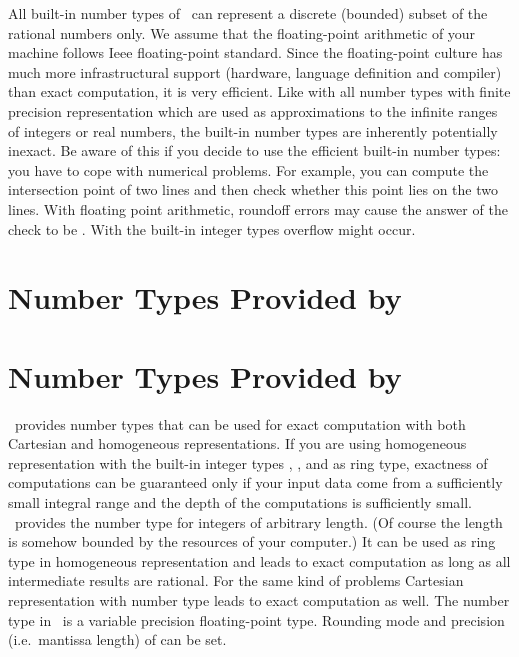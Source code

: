 All built-in number types of \CC\ can represent a discrete (bounded)
subset of the rational numbers only.  We assume that the
floating-point arithmetic of your machine follows {\sc Ieee}
floating-point standard.  Since the floating-point culture has much
more infrastructural support (hardware, language definition and
compiler) than exact computation, it is very efficient.
Like with all number types with finite precision representation
which are used as approximations to the infinite ranges of 
integers or real numbers, the built-in number types are inherently
potentially inexact.
Be aware of this if you decide to use the efficient built-in 
number types: you have to cope with numerical problems.  
For example, you can compute the intersection point of two lines and 
then check whether this point lies on the two lines. 
With floating point arithmetic,
roundoff errors may cause the answer of the check to be . 
With the built-in integer types overflow might occur.

\section{Number Types Provided by \cgal}













\section{Number Types Provided by \leda}
\label{leda-nt}

\leda\ provides number types that can be used for exact computation 
with both Cartesian and homogeneous representations.  If you are using
homogeneous representation with the built-in integer types
, , and  as ring type, exactness of
computations can be guaranteed only if your input data come from a
sufficiently small integral range and the depth of the computations is
sufficiently small.  \leda\ provides the number type  for
integers of arbitrary length. (Of course the length is
somehow bounded by the resources of your computer.)  It can be used as
ring type in homogeneous representation and leads to exact
computation as long as all intermediate results are rational.  For the
same kind of problems Cartesian representation with number type
 leads to exact computation as well.
The number type  in \leda\ is a variable precision
floating-point type. Rounding mode and precision (i.e.\ mantissa length) of
 can be set. 

